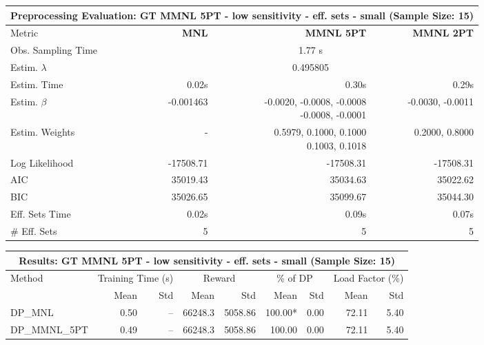 
\begin{samepage}
\begin{center}
  \small
  \begin{tabular}{l|r|r|r}
    \toprule
    \multicolumn{4}{c}{\textbf{Preprocessing Evaluation: GT MMNL 5PT - low sensitivity - eff. sets - small (Sample Size: 15)}} \\
    \midrule
    Metric & \textbf{MNL} & \textbf{MMNL 5PT} & \textbf{MMNL 2PT} \\
    \midrule
    Obs. Sampling Time & \multicolumn{3}{c}{1.77 s} \\
    Estim. $\lambda$ & \multicolumn{3}{c}{0.495805} \\
    Estim. Time & 0.02s & 0.30s & 0.29s \\
    Estim. $\beta$ & -0.001463 & \makecell[tr]{-0.0020, -0.0008, -0.0008 \\ -0.0008, -0.0001} & -0.0030, -0.0011 \\
    Estim. Weights & - & \makecell[tr]{0.5979, 0.1000, 0.1000 \\ 0.1003, 0.1018} & 0.2000, 0.8000 \\
    Log Likelihood & -17508.71 & -17508.31 & -17508.31 \\
    AIC & 35019.43 & 35034.63 & 35022.62 \\
    BIC & 35026.65 & 35099.67 & 35044.30 \\
    Eff. Sets Time & 0.02s & 0.09s & 0.07s \\
    \# Eff. Sets & 5 & 5 & 5 \\
    \bottomrule
  \end{tabular}
\end{center}
\begin{center}
  \small
  \begin{tabular}{l|rr|rr|rr|rr}
    \toprule
    \multicolumn{9}{c}{\textbf{Results: GT MMNL 5PT - low sensitivity - eff. sets - small (Sample Size: 15)}} \\
    \midrule
    Method & \multicolumn{2}{c|}{Training Time (s)} & \multicolumn{2}{c|}{Reward} & \multicolumn{2}{c|}{\% of DP} & \multicolumn{2}{c}{Load Factor (\%)} \\
    & Mean & Std & Mean & Std & Mean & Std & Mean & Std \\
    \midrule
    DP\_MNL      &     0.50 &    -- &    66248.3 &    5058.86 & 100.00* &    0.00 &   72.11 &    5.40 \\
    DP\_MMNL\_5PT &     0.49 &    -- &    66248.3 &    5058.86 &  100.00 &    0.00 &   72.11 &    5.40 \\

\end{tabular}
\end{center}
\end{samepage}
